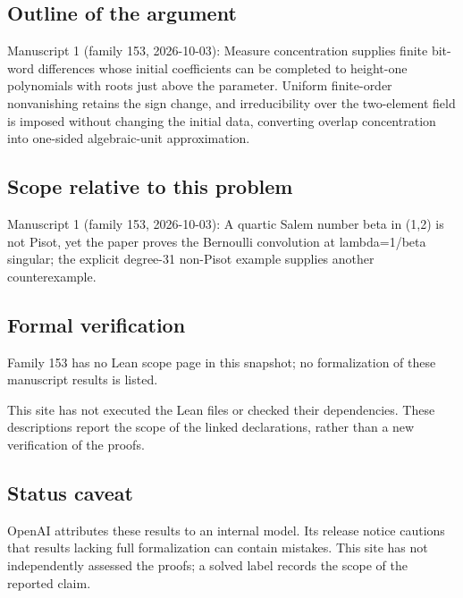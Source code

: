 \documentclass[11pt]{article}
\begin{document}
\subsection{Outline of the argument}
Manuscript 1 (family 153, 2026-10-03): Measure concentration supplies finite bit-word differences whose initial coefficients can be completed to height-one polynomials with roots just above the parameter. Uniform finite-order nonvanishing retains the sign change, and irreducibility over the two-element field is imposed without changing the initial data, converting overlap concentration into one-sided algebraic-unit approximation.

\subsection{Scope relative to this problem}
Manuscript 1 (family 153, 2026-10-03): A quartic Salem number beta in (1,2) is not Pisot, yet the paper proves the Bernoulli convolution at lambda=1/beta singular; the explicit degree-31 non-Pisot example supplies another counterexample.

\subsection{Formal verification}
Family 153 has no Lean scope page in this snapshot; no formalization of these manuscript results is listed.

This site has not executed the Lean files or checked their dependencies. These descriptions report the scope of the linked declarations, rather than a new verification of the proofs.

\subsection{Status caveat}
OpenAI attributes these results to an internal model. Its release notice cautions that results lacking full formalization can contain mistakes. This site has not independently assessed the proofs; a solved label records the scope of the reported claim.
\end{document}
